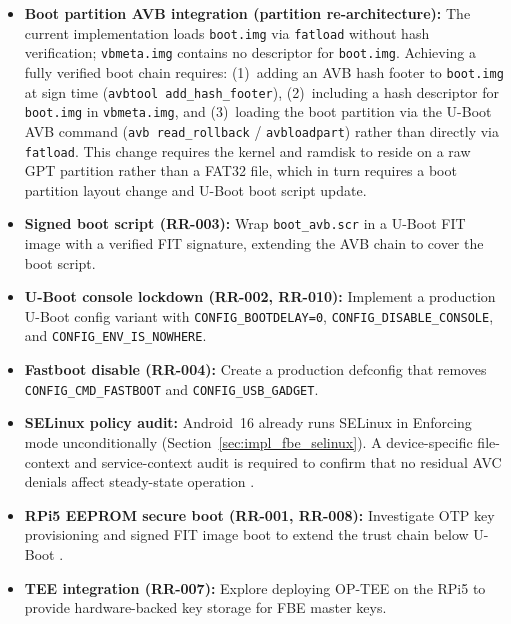 \begin{itemize}
    \item \textbf{Boot partition AVB integration (partition re-architecture):}
    The current implementation loads \texttt{boot.img} via \texttt{fatload} without hash verification; \texttt{vbmeta.img} contains no descriptor for \texttt{boot.img}. Achieving a fully verified boot chain requires: (1)~adding an AVB hash footer to \texttt{boot.img} at sign time (\texttt{avbtool add\_hash\_footer}), (2)~including a hash descriptor for \texttt{boot.img} in \texttt{vbmeta.img}, and (3)~loading the boot partition via the U-Boot AVB command (\texttt{avb read\_rollback} / \texttt{avbloadpart}) rather than directly via \texttt{fatload}. This change requires the kernel and ramdisk to reside on a raw GPT partition rather than a FAT32 file, which in turn requires a boot partition layout change and U-Boot boot script update.

    \item \textbf{Signed boot script (RR-003):} Wrap \texttt{boot\_avb.scr} in a U-Boot FIT image with a verified FIT signature, extending the AVB chain to cover the boot script.

    \item \textbf{U-Boot console lockdown (RR-002, RR-010):} Implement a production U-Boot config variant with \texttt{CONFIG\_BOOTDELAY=0}, \texttt{CONFIG\_DISABLE\_CONSOLE}, and \texttt{CONFIG\_ENV\_IS\_NOWHERE}.

    \item \textbf{Fastboot disable (RR-004):} Create a production defconfig that removes \texttt{CONFIG\_CMD\_FASTBOOT} and \texttt{CONFIG\_USB\_GADGET}.

    \item \textbf{SELinux policy audit:} Android~16 already runs SELinux in Enforcing mode unconditionally (Section~\ref{sec:impl_fbe_selinux}). A device-specific file-context and service-context audit is required to confirm that no residual AVC denials affect steady-state operation \cite{selinux_device_policy}.

    \item \textbf{RPi5 EEPROM secure boot (RR-001, RR-008):} Investigate OTP key provisioning and signed FIT image boot to extend the trust chain below U-Boot \cite{rpi5_eeprom_secure_boot}.

    \item \textbf{TEE integration (RR-007):} Explore deploying OP-TEE \cite{optee_project} on the RPi5 to provide hardware-backed key storage for FBE master keys.


\end{itemize}
